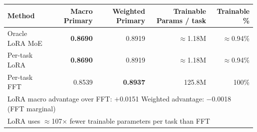 \begin{tabular}{lrrrr}
\toprule
\textbf{Method} & \textbf{Macro Primary} & \textbf{Weighted Primary} & \textbf{Trainable Params / task} & \textbf{Trainable \%} \\
\midrule
Oracle LoRA MoE  & \textbf{0.8690} & 0.8919 & $\approx$1.18M & $\approx$0.94\% \\
Per-task LoRA    & \textbf{0.8690} & 0.8919 & $\approx$1.18M & $\approx$0.94\% \\
Per-task FFT     & 0.8539          & \textbf{0.8937} & 125.8M & 100\% \\
\midrule
\multicolumn{5}{l}{\small LoRA macro advantage over FFT: $+$0.0151 \quad Weighted advantage: $-$0.0018 (FFT marginal)} \\
\multicolumn{5}{l}{\small LoRA uses $\approx$107$\times$ fewer trainable parameters per task than FFT} \\
\bottomrule
\end{tabular}
